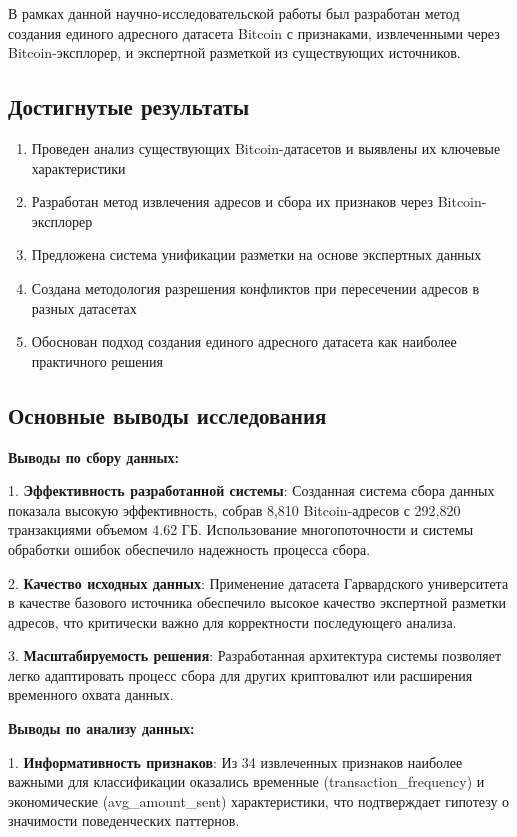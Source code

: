 \conclusion

В рамках данной научно-исследовательской работы был разработан метод создания единого адресного датасета Bitcoin с признаками, извлеченными через Bitcoin-эксплорер, и экспертной разметкой из существующих источников.

\subsection{Достигнутые результаты}

\begin{enumerate}
    \item Проведен анализ существующих Bitcoin-датасетов и выявлены их ключевые характеристики
    \item Разработан метод извлечения адресов и сбора их признаков через Bitcoin-эксплорер
    \item Предложена система унификации разметки на основе экспертных данных
    \item Создана методология разрешения конфликтов при пересечении адресов в разных датасетах
    \item Обоснован подход создания единого адресного датасета как наиболее практичного решения
\end{enumerate}

\subsection{Основные выводы исследования}

\textbf{Выводы по сбору данных:}

1. \textbf{Эффективность разработанной системы}: Созданная система сбора данных показала высокую эффективность, собрав 8,810 Bitcoin-адресов с 292,820 транзакциями объемом 4.62 ГБ. Использование многопоточности и системы обработки ошибок обеспечило надежность процесса сбора.

2. \textbf{Качество исходных данных}: Применение датасета Гарвардского университета в качестве базового источника обеспечило высокое качество экспертной разметки адресов, что критически важно для корректности последующего анализа.

3. \textbf{Масштабируемость решения}: Разработанная архитектура системы позволяет легко адаптировать процесс сбора для других криптовалют или расширения временного охвата данных.

\textbf{Выводы по анализу данных:}

1. \textbf{Информативность признаков}: Из 34 извлеченных признаков наиболее важными для классификации оказались временные (transaction\_frequency) и экономические (avg\_amount\_sent) характеристики, что подтверждает гипотезу о значимости поведенческих паттернов.

